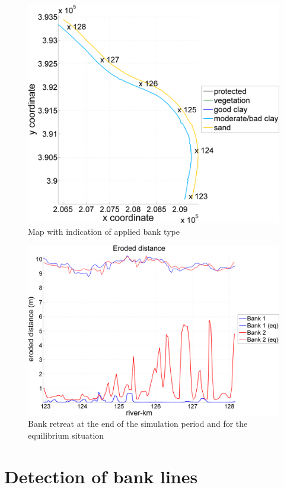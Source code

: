 \begin{figure}
\includegraphics[width=\textwidth]{figures/Fig2-12.png}
\caption{Map with indication of applied bank type}
\label{Fig2.12}
\end{figure}

\begin{figure}
\includegraphics[width=\textwidth]{figures/Fig2-13.png}
\caption{Bank retreat at the end of the simulation period and for the equilibrium situation}
\label{Fig2.13}
\end{figure}

\section{Detection of bank lines}

